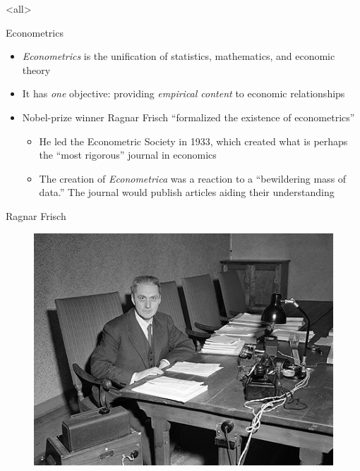 \documentclass[static]{JJH-Beamer}
\begin{document}
\mode<all>{\theTitlePages} %

\begin{frame}{Econometrics}

\begin{itemize}
\item \textit{Econometrics} is the unification of statistics, mathematics, and economic theory
\bigskip 
\item It has \textit{one} objective: providing \textit{empirical content} to economic relationships
\bigskip
\item Nobel-prize winner Ragnar Frisch ``formalized the existence of econometrics''
	\begin{itemize} \small
		\item He led the Econometric Society in 1933, which created what is perhaps the ``most rigorous'' journal in economics
		\item The creation of \textit{Econometrica} was a reaction to a ``bewildering mass of data.'' The journal would publish articles aiding their understanding
	\end{itemize}
\end{itemize}
\end{frame} 

\begin{frame}{Ragnar Frisch}
\begin{figure}[H]
\centering
\includegraphics[width=.8\columnwidth]{frisch0}
\end{figure}
\end{frame} 
\end{document}
